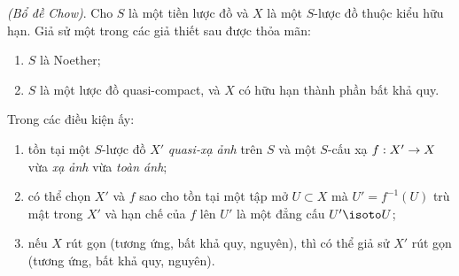 \documentclass[oneside,10pt]{amsart}
\makeatletter
\newcommand{\ega@arrow}[2]{\mathchoice{#1}{#2}{#2}{#2}}
\renewcommand{\to}{\ega@arrow{\longrightarrow}{\rightarrow}}
\let\EGAOriginalLabel\label
\renewcommand{\label}[1]{\phantomsection\EGAOriginalLabel{#1}}
\makeatother
\begin{document}
\begin{theorem}[5.6.1]
\label{II.5.6.1}
\emph{(Bổ đề Chow)}.
Cho $S$ là một tiền lược đồ và $X$ là một $S$-lược đồ thuộc kiểu hữu hạn.
Giả sử một trong các giả thiết sau được thỏa mãn:
\begin{enumerate}
  \item[{\rm(a)}] $S$ là Noether;
  \item[{\rm(b)}] $S$ là một lược đồ quasi-compact, và $X$ có hữu hạn thành phần bất khả quy.
\end{enumerate}
Trong các điều kiện ấy:
\begin{enumerate}
  \item[{\rm(i)}] tồn tại một $S$-lược đồ $X'$ \emph{quasi-xạ ảnh} trên $S$ và một $S$-cấu xạ $f:X'\to X$ vừa \emph{xạ ảnh} vừa \emph{toàn ánh};
  \item[{\rm(ii)}] có thể chọn $X'$ và $f$ sao cho tồn tại một tập mở $U\subset X$ mà $U'=f^{-1}(U)$ trù mật trong $X'$ và hạn chế của $f$ lên $U'$ là một đẳng cấu $U'\isoto U$;
  \item[{\rm(iii)}] nếu $X$ rút gọn (tương ứng, bất khả quy, nguyên), thì có thể giả sử $X'$ rút gọn (tương ứng, bất khả quy, nguyên).
\end{enumerate}
\end{theorem}
\end{document}

